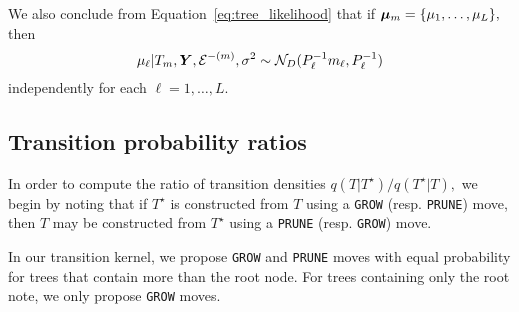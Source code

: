 We also conclude from Equation~\eqref{eq:tree_likelihood} that if $\boldsymbol{\mu}_{m} = \{\mu_{1}, \ldots, \mu_{L}\},$ then
\begin{equation}
\label{eq:mu_posterior}
\mu_{\ell} \vert T_{m}, \bm{Y}, \mathcal{E}^{-(m)}, \sigma^{2} \sim \mathcal{N}_{D}(P_{\ell}^{-1}m_{\ell}, P_{\ell}^{-1})
\end{equation}
independently for each $\ell = 1, \ldots, L.$


\subsection{Transition probability ratios}

In order to compute the ratio of transition densities $q(T \vert T^{\star})/q(T^{\star} \vert T),$ we begin by noting that if $T^{\star}$ is constructed from $T$ using a \texttt{GROW} (resp. \texttt{PRUNE}) move, then $T$ may be constructed from $T^{\star}$ using a \texttt{PRUNE} (resp. \texttt{GROW}) move. 




In our transition kernel, we propose \texttt{GROW} and \texttt{PRUNE} moves with equal probability for trees that contain more than the root node.
For trees containing only the root note, we only propose \texttt{GROW} moves.


\begin{comment}
\textbf{\texttt{GROW} transitions}. Suppose first that $T^{\star}$ is constructed from $T$ using a \texttt{GROW} move.
In order to construct $T^{\star},$ we must randomly select (i) a leaf node $\texttt{nx}$ in $T$ and (ii) a new decision rule $(v(\texttt{nx}), c(\texttt{nx})).$
In $T^{\star},$ the node $\texttt{nx}$ has two children (\texttt{nxl} and \texttt{nxr}) but no grandchildren. 
\end{comment}

